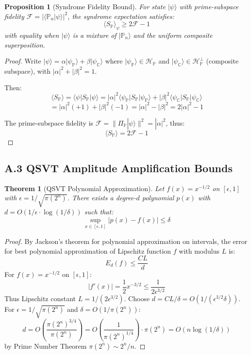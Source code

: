 \documentclass[11pt,letterpaper]{article}
\newtheorem{theorem}{Theorem}
\newtheorem{proposition}{Proposition}
\begin{document}
\begin{proposition}[Syndrome Fidelity Bound]
For state $|\psi\rangle$ with prime-subspace fidelity $\mathcal{F} = |\langle \mathbb{P}_n|\psi\rangle|^2$, the syndrome expectation satisfies:
\[
\langle S_{\mathbb{P}} \rangle_\psi \geq 2\mathcal{F} - 1
\]
with equality when $|\psi\rangle$ is a mixture of $|\mathbb{P}_n\rangle$ and the uniform composite superposition.
\end{proposition}

\begin{proof}
Write $|\psi\rangle = \alpha|\psi_{\mathbb{P}}\rangle + \beta|\psi_{\mathbb{C}}\rangle$ where $|\psi_{\mathbb{P}}\rangle \in \mathcal{H}_{\mathbb{P}}$ and $|\psi_{\mathbb{C}}\rangle \in \mathcal{H}_{\mathbb{P}}^\perp$ (composite subspace), with $|\alpha|^2 + |\beta|^2 = 1$.

Then:
\[
\langle S_{\mathbb{P}} \rangle = \langle \psi|S_{\mathbb{P}}|\psi\rangle = |\alpha|^2 \langle \psi_{\mathbb{P}}|S_{\mathbb{P}}|\psi_{\mathbb{P}}\rangle + |\beta|^2 \langle \psi_{\mathbb{C}}|S_{\mathbb{P}}|\psi_{\mathbb{C}}\rangle
\]
\[
= |\alpha|^2(+1) + |\beta|^2(-1) = |\alpha|^2 - |\beta|^2 = 2|\alpha|^2 - 1
\]

The prime-subspace fidelity is $\mathcal{F} = \|\Pi_{\mathbb{P}}|\psi\rangle\|^2 = |\alpha|^2$, thus:
\[
\langle S_{\mathbb{P}} \rangle = 2\mathcal{F} - 1
\]
\end{proof}

\subsection{A.3 QSVT Amplitude Amplification Bounds}

\begin{theorem}[QSVT Polynomial Approximation]
Let $f(x) = x^{-1/2}$ on $[\epsilon, 1]$ with $\epsilon = 1/\sqrt{\pi(2^n)}$. There exists a degree-$d$ polynomial $p(x)$ with $d = O(1/\epsilon \cdot \log(1/\delta))$ such that:
\[
\sup_{x \in [\epsilon, 1]} |p(x) - f(x)| \leq \delta
\]
\end{theorem}

\begin{proof}
By Jackson's theorem for polynomial approximation on intervals, the error for best polynomial approximation of Lipschitz function $f$ with modulus $L$ is:
\[
E_d(f) \leq \frac{CL}{d}
\]
For $f(x) = x^{-1/2}$ on $[\epsilon, 1]$:
\[
|f'(x)| = \frac{1}{2}x^{-3/2} \leq \frac{1}{2\epsilon^{3/2}}
\]
Thus Lipschitz constant $L = 1/(2\epsilon^{3/2})$. Choose $d = CL/\delta = O(1/(\epsilon^{3/2}\delta))$. For $\epsilon = 1/\sqrt{\pi(2^n)}$ and $\delta = O(1/\pi(2^n))$:
\[
d = O\left(\frac{\pi(2^n)^{3/4}}{\pi(2^n)}\right) = O\left(\frac{1}{\pi(2^n)^{1/4}}\right) \cdot \pi(2^n) = O(n\log(1/\delta))
\]
by Prime Number Theorem $\pi(2^n) \sim 2^n/n$.
\end{proof}
\end{document}
